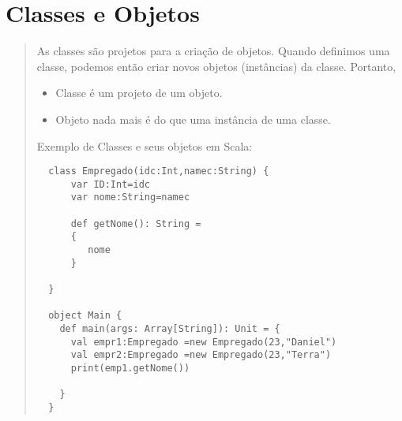 \section{Classes e Objetos}
\begin{quote}
  As classes são projetos para a criação de objetos. Quando definimos uma classe, podemos então criar novos objetos (instâncias) da classe.
  \cite{Wampler2021}Portanto,
  \begin{itemize}
  \item Classe é um projeto de um objeto.
  \item Objeto nada mais é do que uma instância de uma classe.
  \end{itemize}
  \hspace{2.5mm} Exemplo de Classes e seus objetos em Scala:

  \begin{lstlisting}
  class Empregado(idc:Int,namec:String) {
      var ID:Int=idc
      var nome:String=namec

      def getNome(): String =
      {
         nome
      }

  }

  object Main {
    def main(args: Array[String]): Unit = {
      val empr1:Empregado =new Empregado(23,"Daniel")
      val empr2:Empregado =new Empregado(23,"Terra")
      print(emp1.getNome())

    }
  }
  \end{lstlisting}

\end{quote}

